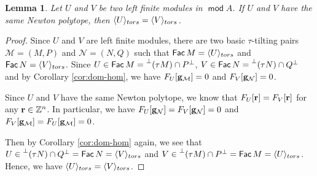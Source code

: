 \documentclass[10pt,a4paper]{amsart}
\newtheorem{lemma}{Lemma}
\newcommand{\Fac}{\opname{Fac}}
\def\mod{\opname{mod}\nolimits}
\newcommand{\opname}[1]{\operatorname{\mathsf{#1}}}
\begin{document}
\begin{lemma}\label{lem:UV-torsion}
    Let $U$ and $V$ be two left finite modules in $\mod A$. If $U$ and $V$ have the same Newton polytope, then $\langle U\rangle_{\rm tors}=\langle V\rangle_{\rm tors}$.
\end{lemma}

\begin{proof}
 Since $U$ and $V$ are left finite modules, there are two basic $\tau$-tilting pairs $\mathcal M=(M,P)$ and $\mathcal N=(N, Q)$ such that $\Fac M=\langle U\rangle_{\rm tors}$ and $\Fac N=\langle V\rangle_{\rm tors}$.
 Since $U\in\Fac M=\prescript{\bot}{}(\tau M)\cap P^{\bot}$, $V\in\Fac N=\prescript{\bot}{}(\tau N)\cap Q^{\bot}$ and
 by Corollary \ref{cor:dom-hom}, we have $F_U[{\bf g}_{\mathcal M}]=0$ and $F_V[{\bf g}_{\mathcal N}]=0$.

 Since $U$ and $V$ have the same Newton polytope, we know that $F_U[{\bf r}]=F_V[{\bf r}]$ for any ${\bf r}\in\mathbb Z^n$. In particular, we have $F_U[{\bf g}_{\mathcal N}]=F_V[{\bf g}_{\mathcal N}]=0$ and $F_V[{\bf g}_{\mathcal M}]=F_U[{\bf g}_{\mathcal M}]=0$.

 Then by Corollary \ref{cor:dom-hom} again, we see that $U\in \prescript{\bot}{}(\tau N)\cap Q^{\bot}=\Fac N=\langle V\rangle_{\rm tors}$ and $V\in \prescript{\bot}{}(\tau M)\cap P^{\bot}=\Fac M=\langle U\rangle_{\rm tors}$. Hence, we have $\langle U\rangle_{\rm tors}=\langle V\rangle_{\rm tors}$.
\end{proof}
\end{document}
